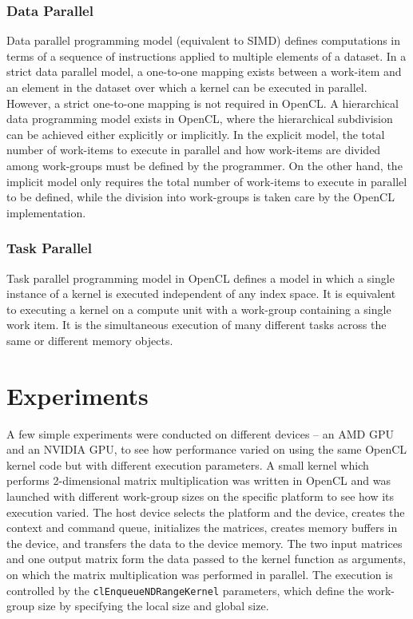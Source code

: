 \subsubsection{Data Parallel}
Data parallel programming model (equivalent to SIMD) defines computations in terms of a sequence of instructions applied to multiple elements of a dataset. In a strict data parallel model, a one-to-one mapping exists between a work-item and an element in the dataset over which a kernel can be executed in parallel. However, a strict one-to-one mapping is not required in OpenCL. \newline\newline
A hierarchical data programming model exists in OpenCL, where the hierarchical subdivision can be achieved either explicitly or implicitly. In the explicit model, the total number of work-items to execute in parallel and how work-items are divided among work-groups must be defined by the programmer. On the other hand, the implicit model only requires the total number of work-items to execute in parallel to be defined, while the division into work-groups is taken care by the OpenCL implementation.

\subsubsection{Task Parallel}
Task parallel programming model in OpenCL defines a model in which a single instance of a kernel is executed independent of any index space. It is equivalent to executing a kernel on a compute unit with a work-group containing a single work item. It is the simultaneous execution of many different tasks across the same or different memory objects.

\section{Experiments}
A few simple experiments were conducted on different devices – an AMD GPU and an NVIDIA GPU, to see how performance varied on using the same OpenCL kernel code but with different execution parameters. A small kernel which performs 2-dimensional matrix multiplication was written in OpenCL and was launched with different work-group sizes on the specific platform to see how its execution varied. \newline\newline
The host device selects the platform and the device, creates the context and command queue, initializes the matrices, creates memory buffers in the device, and transfers the data to the device memory. The two input matrices and one output matrix form the data passed to the kernel function as arguments, on which the matrix multiplication was performed in parallel. The execution is controlled by the \verb|clEnqueueNDRangeKernel| parameters, which define the work-group size by specifying the local size and global size. \newline\newline

